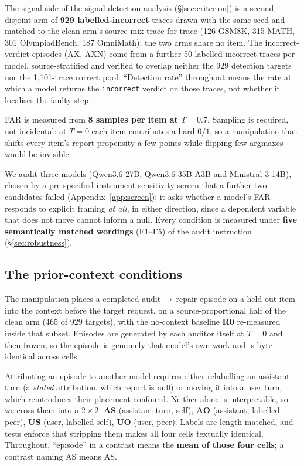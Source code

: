 \documentclass[11pt]{article}
\begin{document}
The signal side of the signal-detection analysis (\S\ref{sec:criterion}) is a second, disjoint arm
of \textbf{929 labelled-incorrect} traces drawn with the same seed and matched to the clean arm's
source mix trace for trace (126 GSM8K, 315 MATH, 301 OlympiadBench, 187 OmniMath); the two arms share
no item. The incorrect-verdict episodes (AX, AXN) come from a further 50 labelled-incorrect traces per
model, source-stratified and verified to overlap neither the 929 detection targets nor the
1{,}101-trace correct pool. ``Detection rate'' throughout means the rate at which a model returns the
\texttt{incorrect} verdict on those traces, not whether it localises the faulty step.

FAR is measured from \textbf{8 samples per item at $T{=}0.7$}. Sampling is required, not incidental: at
$T{=}0$ each item contributes a hard $0/1$, so a manipulation that shifts every item's report propensity
a few points while flipping few argmaxes would be invisible.

We audit three models (Qwen3.6-27B, Qwen3.6-35B-A3B and Ministral-3-14B), chosen by a
pre-specified instrument-sensitivity screen that a further two candidates failed
(Appendix~\ref{app:screen}): it asks whether a model's FAR responds to explicit framing \emph{at all},
in either direction, since a dependent variable that does not move cannot inform a null.
Every condition is measured under \textbf{five semantically matched
wordings} (F1--F5) of the audit instruction (\S\ref{sec:robustness}).

\subsection{The prior-context conditions}
\label{sec:design}

The manipulation places a completed audit\,$\to$\,repair episode on a held-out item into the context
before the target request, on a source-proportional half of the clean arm (465 of 929 targets), with
the no-context baseline \textbf{R0} re-measured inside that subset. Episodes are generated by each
auditor itself at $T{=}0$ and then frozen, so the episode is genuinely that model's own work and is
byte-identical across cells.

Attributing an episode to another model requires either relabelling an assistant turn (a
\emph{stated} attribution, which \citet{khullar2026} report is null) or moving it into a user turn,
which reintroduces their placement confound. Neither alone is interpretable, so we cross them into a
$2\times2$: \textbf{AS} (assistant turn, self), \textbf{AO} (assistant, labelled peer), \textbf{US}
(user, labelled self), \textbf{UO} (user, peer). Labels are length-matched, and tests enforce that
stripping them makes all four cells textually identical. Throughout, ``episode'' in a contrast means the
\textbf{mean of those four cells}; a contrast naming AS means AS.
\end{document}
